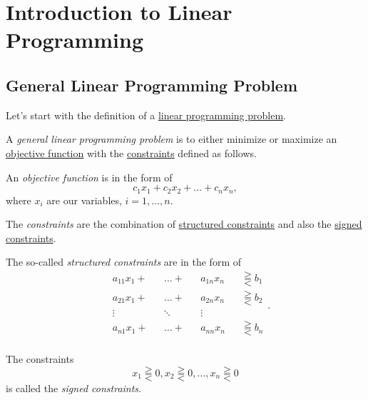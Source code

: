 \chapter{Introduction to Linear Programming}
\section{General Linear Programming Problem}
Let's start with the definition of a \hyperref[def:general-linear-programming-problem]{linear programming problem}.
\begin{definition}\label{def:general-linear-programming-problem}
	A \emph{general linear programming problem} is to either minimize or maximize an \hyperref[def:objective-function]{objective function} with the
	\hyperref[def:constraints]{constraints} defined as follows.

	\begin{definition}\label{def:objective-function}
		An \emph{objective function} is in the form of
		\[
			c_1 x_1 + c_2 x_2 + \ldots +c_n x_n,
		\]
		where \(x_{i}\) are our variables, \(i = 1, \ldots, n\).
	\end{definition}

	\begin{definition}[Constraints]\label{def:constraints}
		The \emph{constraints} are the combination of \hyperref[def:structured-constraints]{structured constraints} and also the \hyperref[def:signed-constraints]{signed constraints}.
		\begin{definition}\label{def:structured-constraints}
			The so-called \emph{structured constraints} are in the form of
			\[
				\begin{alignedat}{4}
					&a_{11} x_1 + &&\ldots + &&a_{1n}x_n &&\gtreqqless b_1\\
					&a_{21} x_1 + &&\ldots + &&a_{2n}x_n &&\gtreqqless b_2\\
					&\vdots &&\ddots &&\vdots && \\
					&a_{n1} x_1 + &&\ldots + &&a_{nn}x_n &&\gtreqqless b_n\\
				\end{alignedat}.
			\]
		\end{definition}
		\begin{definition}\label{def:signed-constraints}
			The constraints
			\[
				x_1 \gtreqqless 0, x_2\gtreqqless 0, \ldots ,x_n\gtreqqless 0
			\]
			is called the \emph{signed constraints}.
		\end{definition}
	\end{definition}
\end{definition}

